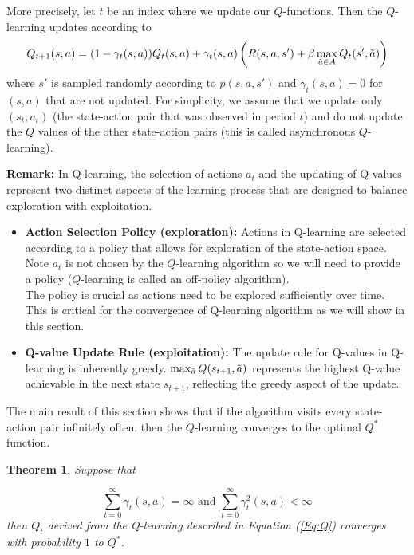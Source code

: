 \documentclass[letter,11pt]{article}
\newtheorem{theorem}{Theorem}[section]
\begin{document}
More precisely, let $t$ be an index where we update our $Q$-functions. Then the $Q$-learning updates according to 
\begin{equation} \label{Eq:Q}
     Q_{t+1} (s,a) = (1- \gamma_{t}(s,a) ) Q_{t}(s,a) + \gamma_{t}(s,a) \left (R(s,a,s')  + \beta \max_{\Tilde{a} \in A} Q_{t}(s' , \Tilde{a})\right )
     \end{equation}
where $s'$ is sampled randomly  according to $p(s,a,s')$ and $\gamma_{t}(s,a) =0$ for $(s,a)$ that are not updated. For simplicity, we assume that we update only $(s_{t},a_{t})$ (the state-action pair that was observed in period $t$) and do not update the $Q$ values of the other state-action pairs (this is called asynchronous $Q$-learning). 

\textbf{Remark:} In Q-learning, the selection of actions \(a_t\) and the updating of Q-values represent two distinct aspects of the learning process that are designed to balance exploration with exploitation.

\begin{itemize}
    \item \textbf{Action Selection Policy (exploration):} Actions in Q-learning are selected according to a policy that allows for exploration of the state-action space. Note $a_{t}$ is not chosen by the $Q$-learning algorithm so we will need to provide a policy ($Q$-learning is called an off-policy algorithm). \\ 
    The policy is crucial as actions need to be explored sufficiently over time. This is critical for the convergence of Q-learning algorithm as we will show in this section. 
 \item \textbf{Q-value Update Rule (exploitation):} The update rule for Q-values in Q-learning is inherently greedy. 
       \(\max_{\Tilde{a}} Q(s_{t+1}, \Tilde{a})\) represents the highest Q-value achievable in the next state \(s_{t+1}\), reflecting the greedy aspect of the update. 

       
    \end{itemize}
    


The main result of this section shows that if the algorithm visits every state-action pair infinitely often, then the $Q$-learning converges to the optimal $Q^{*}$ function. 

\begin{theorem}
    Suppose that 

    $$ \sum _{t=0}^{\infty} \gamma_{t} (s,a) = \infty \text { and } \sum _{t=0}^{\infty} \gamma_{t} ^{2} (s,a) < \infty$$
    then $Q_{t}$ derived from the Q-learning described in Equation (\ref{Eq:Q}) converges with probability $1$ to $Q^{*}$.  
\end{theorem}
\end{document}
